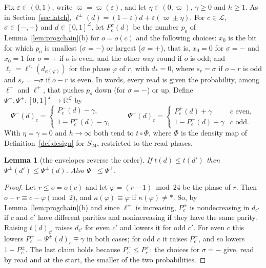 \documentclass[11pt]{amsart}
\newtheorem{lemma}[theorem]{Lemma}
\theoremstyle{definition}
\theoremstyle{remark}
\newcommand{\eps}{\varepsilon}
\begin{document}
Fix $\eps\in(0,1)$, write $\varpi=\varpi(\eps)$, and let $\eta\in(0,\varpi)$, $\gamma\ge0$ and
$h\ge1$. As in Section~\ref{sec:latch}, $\ell^\pm(d)=(1-\eps)d+\eps(\varpi\pm\eta)$. For
$c\in\mathcal L$, $\sigma\in\{-,+\}$ and $d\in[0,1]^\mathcal L$, let $P^\sigma_c(d)$ be the number $p_o$ of
Lemma~\ref{lem:progchain}(b) for $o=o(c)$ and the following choices: $x_0$ is the bit for which
$p_o$ is smallest ($\sigma=-$) or largest ($\sigma=+$), that is, $x_0=0$ for $\sigma=-$ and $x_0=1$
for $\sigma=+$ if $o$ is even, and the other way round if $o$ is odd; and
$\ell_r=\ell^{s_r}(d_{\kappa(\varphi)})$ for the phase $\varphi$ of $r$, with $d_\ast=0$, where
$s_r=\sigma$ if $o-r$ is odd and $s_r=-\sigma$ if $o-r$ is even. In words, every read is given the
probability, among $\ell^-$ and $\ell^+$, that pushes $p_o$ down (for $\sigma=-$) or up. Define
$\Psi^-,\Psi^+:[0,1]^\mathcal L\to\mathbb R^\mathcal L$ by
\[
\Psi^-(d)_c=\begin{cases}P^-_c(d)-\gamma,\\ 1-P^+_c(d)-\gamma,\end{cases}\qquad
\Psi^+(d)_c=\begin{cases}P^+_c(d)+\gamma&c\text{ even},\\ 1-P^-_c(d)+\gamma&c\text{ odd}.\end{cases}
\]
With $\eta=\gamma=0$ and $h\to\infty$ both tend to $t\circ\Phi$, where $\Phi$ is the density map of
Definition~\ref{def:design} for $S_{24}$, restricted to the read phases.

\begin{lemma}[the envelopes reverse the order]\label{lem:envelope}
If $t(d)\le t(d')$ then $\Psi^\pm(d')\le\Psi^\pm(d)$. Also $\Psi^-\le\Psi^+$.
\end{lemma}

\begin{proof}
Let $r\le o=o(c)$ and let $\varphi=(r-1)\bmod24$ be the phase of $r$. Then
$o-r\equiv c-\varphi\pmod2$, and $\kappa(\varphi)\equiv\varphi$ if $\kappa(\varphi)\ne\ast$. So,
by Lemma~\ref{lem:progchain}(b) and since $\ell^\pm$ is increasing, $P^\pm_c$ is nondecreasing in
$d_{c'}$ if $c$ and $c'$ have different parities and nonincreasing if they have the same parity.
Raising $t(d)_{c'}$ raises $d_{c'}$ for even $c'$ and lowers it for odd $c'$. For even $c$ this
lowers $P^\pm_c=\Psi^\pm(d)_c\mp\gamma$ in both cases; for odd $c$ it raises $P^\pm_c$, and so lowers
$1-P^\pm_c$. The last claim holds because $P^-_c\le P^+_c$: the choices for $\sigma=-$ give, read by
read and at the start, the smaller of the two probabilities.
\end{proof}
\end{document}
